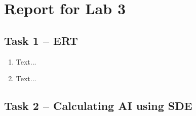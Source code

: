 \documentclass[a4paper, DIV12, headsepline]{scrartcl}
\begin{document}
\section*{Report for Lab 3}
\subsection*{Task 1 -- ERT}
\begin{enumerate}[label=\alph*)]
\item Text...

\item Text...
\end{enumerate}

\subsection*{Task 2 -- Calculating AI using SDE}
\end{document}
